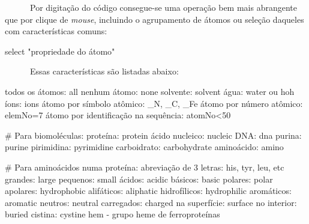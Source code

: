 \documentclass[
  letterpaper,
  DIV=11,
  numbers=noendperiod]{scrreprt}
\newenvironment{Shaded}{\begin{snugshade}}{\end{snugshade}}
\newcommand{\CommentTok}[1]{\textcolor[rgb]{0.37,0.37,0.37}{#1}}
\newcommand{\DecValTok}[1]{\textcolor[rgb]{0.68,0.00,0.00}{#1}}
\newcommand{\NormalTok}[1]{\textcolor[rgb]{0.00,0.23,0.31}{#1}}
\newcommand{\OtherTok}[1]{\textcolor[rgb]{0.00,0.23,0.31}{#1}}
\newcommand{\SpecialCharTok}[1]{\textcolor[rgb]{0.37,0.37,0.37}{#1}}
\newcommand{\StringTok}[1]{\textcolor[rgb]{0.13,0.47,0.30}{#1}}
\begin{document}
~~~~~~Por digitação do código consegue-se uma operação bem mais
abrangente que por clique de \emph{mouse}, incluindo o agrupamento de
átomos ou seleção daqueles com características comuns:

\begin{Shaded}
\begin{Highlighting}[]
\NormalTok{select }\StringTok{"propriedade do átomo"}
\end{Highlighting}
\end{Shaded}

~~~~~~Essas características são listadas abaixo:

\begin{Shaded}
\begin{Highlighting}[]
\NormalTok{todos os átomos}\SpecialCharTok{:}\NormalTok{ all }
\NormalTok{nenhum átomo}\SpecialCharTok{:}\NormalTok{ none}
\NormalTok{solvente}\SpecialCharTok{:}\NormalTok{ solvent}
\NormalTok{água}\SpecialCharTok{:}\NormalTok{ water ou hoh}
\NormalTok{íons}\SpecialCharTok{:}\NormalTok{ ions}
\NormalTok{átomo por símbolo atômico}\SpecialCharTok{:}\NormalTok{ \_N, \_C, \_Fe}
\NormalTok{átomo por número atômico}\SpecialCharTok{:}\NormalTok{ elemNo}\OtherTok{=}\DecValTok{7}
\NormalTok{átomo por identificação na sequência}\SpecialCharTok{:}\NormalTok{ atomNo}\SpecialCharTok{\textless{}}\DecValTok{50}

\CommentTok{\# Para biomoléculas:}
\NormalTok{proteína}\SpecialCharTok{:}\NormalTok{ protein}
\NormalTok{ácido nucleico}\SpecialCharTok{:}\NormalTok{ nucleic}
\NormalTok{DNA}\SpecialCharTok{:}\NormalTok{ dna}
\NormalTok{purina}\SpecialCharTok{:}\NormalTok{ purine}
\NormalTok{pirimidina}\SpecialCharTok{:}\NormalTok{ pyrimidine}
\NormalTok{carboidrato}\SpecialCharTok{:}\NormalTok{ carbohydrate}
\NormalTok{aminoácido}\SpecialCharTok{:}\NormalTok{ amino}


\CommentTok{\# Para aminoácidos numa proteína:}
\NormalTok{abreviação de }\DecValTok{3}\NormalTok{ letras}\SpecialCharTok{:}\NormalTok{ his, tyr, leu, etc}
\NormalTok{grandes}\SpecialCharTok{:}\NormalTok{ large}
\NormalTok{pequenos}\SpecialCharTok{:}\NormalTok{ small}
\NormalTok{ácidos}\SpecialCharTok{:}\NormalTok{ acidic}
\NormalTok{básicos}\SpecialCharTok{:}\NormalTok{ basic}
\NormalTok{polares}\SpecialCharTok{:}\NormalTok{ polar}
\NormalTok{apolares}\SpecialCharTok{:}\NormalTok{ hydrophobic}
\NormalTok{alifáticos}\SpecialCharTok{:}\NormalTok{ aliphatic}
\NormalTok{hidrofílicos}\SpecialCharTok{:}\NormalTok{ hydrophilic}
\NormalTok{aromáticos}\SpecialCharTok{:}\NormalTok{ aromatic}
\NormalTok{neutros}\SpecialCharTok{:}\NormalTok{ neutral}
\NormalTok{carregados}\SpecialCharTok{:}\NormalTok{ charged}
\NormalTok{na superfície}\SpecialCharTok{:}\NormalTok{ surface}
\NormalTok{no interior}\SpecialCharTok{:}\NormalTok{ buried}
\NormalTok{cistina}\SpecialCharTok{:}\NormalTok{ cystine}
\NormalTok{hem }\SpecialCharTok{{-}}\NormalTok{ grupo heme de ferroproteínas}


\end{Highlighting}
\end{Shaded}
\end{document}
